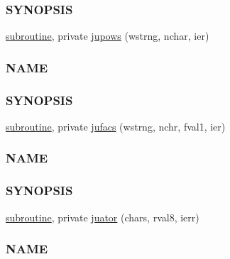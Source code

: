 \begin{DoxyCompactItemize}
\begin{DoxyCompactList}
\subsubsection*{S\+Y\+N\+O\+P\+S\+IS}\end{DoxyCompactList}\item 
\hyperlink{M__stopwatch_83_8txt_acfbcff50169d691ff02d4a123ed70482}{subroutine}, private \hyperlink{namespacem__calculator_ae1afc2ee970ad4635cce19b9b8b74f1c}{jupows} (wstrng, nchar, ier)
\begin{DoxyCompactList}\small\item\em \subsubsection*{N\+A\+ME}

\subsubsection*{S\+Y\+N\+O\+P\+S\+IS}\end{DoxyCompactList}\item 
\hyperlink{M__stopwatch_83_8txt_acfbcff50169d691ff02d4a123ed70482}{subroutine}, private \hyperlink{namespacem__calculator_a78c73098f0fcf1130ea9f5f3748bef7d}{jufacs} (wstrng, nchr, fval1, ier)
\begin{DoxyCompactList}\small\item\em \subsubsection*{N\+A\+ME}

\subsubsection*{S\+Y\+N\+O\+P\+S\+IS}\end{DoxyCompactList}\item 
\hyperlink{M__stopwatch_83_8txt_acfbcff50169d691ff02d4a123ed70482}{subroutine}, private \hyperlink{namespacem__calculator_a99dafdeb0fe1a589face7a3eaf5c66bd}{juator} (chars, rval8, ierr)
\begin{DoxyCompactList}\small\item\em \subsubsection*{N\+A\+ME}


\end{DoxyCompactList}
\end{DoxyCompactItemize}
